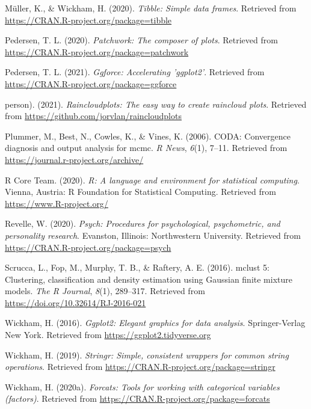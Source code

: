 \documentclass[
  english,
  jou,floatsintext]{apa6}
\begin{document}
\leavevmode\hypertarget{ref-R-tibble}{}%
Müller, K., \& Wickham, H. (2020). \emph{Tibble: Simple data frames}. Retrieved from \url{https://CRAN.R-project.org/package=tibble}

\leavevmode\hypertarget{ref-R-patchwork}{}%
Pedersen, T. L. (2020). \emph{Patchwork: The composer of plots}. Retrieved from \url{https://CRAN.R-project.org/package=patchwork}

\leavevmode\hypertarget{ref-R-ggforce}{}%
Pedersen, T. L. (2021). \emph{Ggforce: Accelerating 'ggplot2'}. Retrieved from \url{https://CRAN.R-project.org/package=ggforce}

\leavevmode\hypertarget{ref-R-raincloudplots}{}%
person). (2021). \emph{Raincloudplots: The easy way to create raincloud plots}. Retrieved from \url{https://github.com/jorvlan/raincloudplots}

\leavevmode\hypertarget{ref-R-coda}{}%
Plummer, M., Best, N., Cowles, K., \& Vines, K. (2006). CODA: Convergence diagnosis and output analysis for mcmc. \emph{R News}, \emph{6}(1), 7--11. Retrieved from \url{https://journal.r-project.org/archive/}

\leavevmode\hypertarget{ref-R-base}{}%
R Core Team. (2020). \emph{R: A language and environment for statistical computing}. Vienna, Austria: R Foundation for Statistical Computing. Retrieved from \url{https://www.R-project.org/}

\leavevmode\hypertarget{ref-R-psych}{}%
Revelle, W. (2020). \emph{Psych: Procedures for psychological, psychometric, and personality research}. Evanston, Illinois: Northwestern University. Retrieved from \url{https://CRAN.R-project.org/package=psych}

\leavevmode\hypertarget{ref-R-mclust}{}%
Scrucca, L., Fop, M., Murphy, T. B., \& Raftery, A. E. (2016). mclust 5: Clustering, classification and density estimation using Gaussian finite mixture models. \emph{The R Journal}, \emph{8}(1), 289--317. Retrieved from \url{https://doi.org/10.32614/RJ-2016-021}

\leavevmode\hypertarget{ref-R-ggplot2}{}%
Wickham, H. (2016). \emph{Ggplot2: Elegant graphics for data analysis}. Springer-Verlag New York. Retrieved from \url{https://ggplot2.tidyverse.org}

\leavevmode\hypertarget{ref-R-stringr}{}%
Wickham, H. (2019). \emph{Stringr: Simple, consistent wrappers for common string operations}. Retrieved from \url{https://CRAN.R-project.org/package=stringr}

\leavevmode\hypertarget{ref-R-forcats}{}%
Wickham, H. (2020a). \emph{Forcats: Tools for working with categorical variables (factors)}. Retrieved from \url{https://CRAN.R-project.org/package=forcats}
\end{document}
